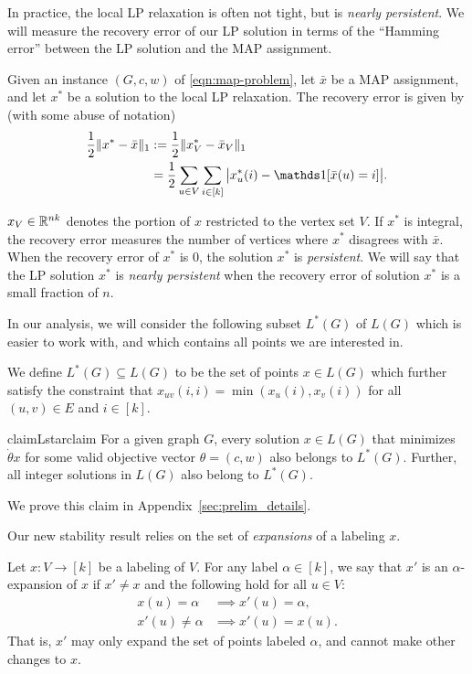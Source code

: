 \vspace{2pt}
 In practice, the local LP relaxation is often not tight, but is \emph{nearly persistent}.
We will measure the recovery error of our LP solution in terms of the ``Hamming error'' between the LP solution and the MAP assignment. 

\begin{definition}\label{def:hammingerror}
Given an instance $(G,c,w)$ of \eqref{eqn:map-problem}, let $\bar{x}$ be a MAP assignment, and let $x^*$ be a solution to the local LP relaxation. The recovery error  is given by (with some abuse of notation)
\begin{align*}
\frac{1}{2}\|x^* - \bar{x}\|_1 &:= \frac{1}{2}\|x^*_V - \bar{x}_V\|_1 \\
&=\frac{1}{2}\sum_{ u \in V} \sum_{i \in [k]} \big| x^*_u(i) - \indicator[\bar{x}(u) = i ] \big|.
\end{align*}
\end{definition}
$x_V \in \mathbb{R}^{nk}$ denotes the portion of $x$ restricted to the vertex set $V$. If $x^*$ is integral, the recovery error measures the number of vertices where $x^*$ disagrees with $\bar{x}$. When the recovery error of $x^*$ is $0$, the solution $x^*$ is {\em persistent}. 
We will say that the LP solution $x^*$ is {\em nearly persistent} when the recovery error of solution $x^*$ is a small fraction of $n$.

In our analysis, we will consider the following subset $L^*(G)$ of $L(G)$ which is easier to work with, and which contains all points we are interested in.

\begin{definition}[$L^*(G)$]
\label{def:L*}
We define $L^*(G) \subseteq L(G)$ to be the set of points $x \in L(G)$ which further satisfy the constraint that $x_{uv}(i,i) = \min(x_u(i), x_v(i))$ for all $(u,v) \in E$ and $i \in [k]$.
\end{definition}

\begin{restatable}[]{claim}{Lstarclaim}\label{claim:Lstar}
For a given graph $G$, every solution $x \in L(G)$ that minimizes $\dot{\theta}{x}$ for some valid objective vector $\theta=(c,w)$ also belongs to $L^*(G)$. Further, all integer solutions in $L(G)$ also belong to $L^*(G)$. 
\end{restatable}
We prove this claim in Appendix~\ref{sec:prelim_details}.

Our new stability result relies on the set of \emph{expansions} of a labeling $x$.
\begin{definition}[Expansion]
\label{def:expansion}
Let $x: V\to [k]$ be a labeling of $V$. For any label $\alpha \in [k]$, we say that $x'$ is an $\alpha$-expansion of $x$ if $x' \ne x$ and the following hold for all $u\in V$:
\begin{align*}
x(u) = \alpha &\implies x'(u) = \alpha,\\
x'(u) \ne \alpha &\implies x'(u) = x(u).
\end{align*}
That is, $x'$ may only expand the set of points labeled $\alpha$, and cannot make other changes to $x$.
\end{definition}
